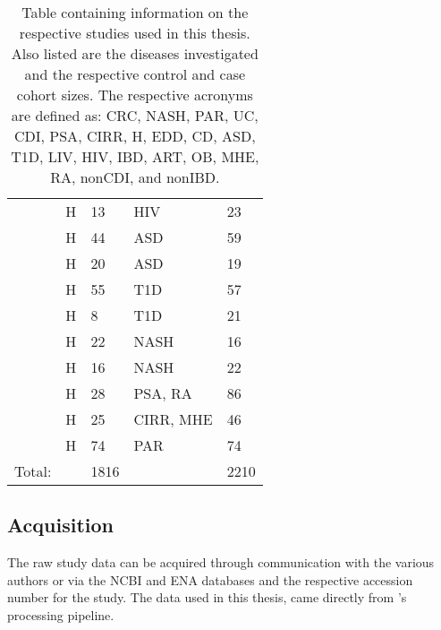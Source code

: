 \begin{table}[hbtp!]
\begin{tabular}{l l p{} l p{}}
		\cite{lozupone2013alterations} & \acrshort{H} & 13 & \acrshort{HIV} & 23 \\
		\cite{asd-son} & \acrshort{H} & 44 & \acrshort{ASD} & 59 \\
		\cite{asd-kang} & \acrshort{H} & 20 & \acrshort{ASD} & 19 \\
		\cite{t1d-alkanani} & \acrshort{H} & 55 & \acrshort{T1D} & 57 \\
		\cite{t1d-mejia} & \acrshort{H} & 8 & \acrshort{T1D} & 21 \\
		\cite{nash-chan} & \acrshort{H} & 22 & \acrshort{NASH} & 16 \\
		\cite{nash-zhu} & \acrshort{H} & 16 & \acrshort{NASH} & 22 \\
		\cite{art-scher} & \acrshort{H} & 28 & \acrshort{PSA}, \acrshort{RA} & 86 \\
		\cite{mhe-zhang} & \acrshort{H} & 25 & \acrshort{CIRR}, \acrshort{MHE} & 46 \\
		\cite{par-schep} & \acrshort{H} & 74 & \acrshort{PAR} & 74 \\
		\midrule
		\midrule
		Total: & & 1816& & 2210\\
		\bottomrule
    \end{tabular}
    \caption[Table containing information on the respective studies used in this thesis. Also listed are the diseases investigated and the respective control and case cohort sizes.]{Table containing information on the respective studies used in this thesis. Also listed are the diseases investigated and the respective control and case cohort sizes. The respective acronyms are defined as: \acrfull{CRC}, \acrfull{NASH}, \acrfull{PAR}, \acrfull{UC}, \acrfull{CDI}, \acrfull{PSA}, \acrfull{CIRR}, \acrfull{H}, \acrfull{EDD}, \acrfull{CD}, \acrfull{ASD}, \acrfull{T1D}, \acrfull{LIV}, \acrfull{HIV}, \acrfull{IBD}, \acrfull{ART}, \acrfull{OB}, \acrfull{MHE}, \acrfull{RA}, \acrfull{nonCDI}, and \acrfull{nonIBD}.}
    \label{tab:study_table}
\end{table}

\subsection{Acquisition}\label{sec:meth-acq}
The raw study data can be acquired through communication with the various authors or via the \acrfull{NCBI} and \acrfull{ENA} databases and the respective accession number for the study. The data used in this thesis, came directly from \citeauthor{Duvallet2017}'s processing pipeline. 

